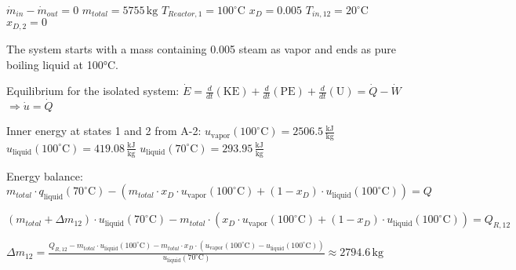 \( \dot{m}_{in} - \dot{m}_{out} = 0 \)  
\( m_{total} = 5755 \, \text{kg} \)  
\( T_{Reactor,1} = 100^\circ \text{C} \)  
\( x_D = 0.005 \)  
\( T_{in,12} = 20^\circ \text{C} \)  
\( x_{D,2} = 0 \)  

The system starts with a mass containing 0.005 steam as vapor and ends as pure boiling liquid at 100°C.  

Equilibrium for the isolated system:  
\( \dot{E} = \frac{d}{dt} (\text{KE}) + \frac{d}{dt} (\text{PE}) + \frac{d}{dt} (\text{U}) = \dot{Q} - \dot{W} \)  
\( \Rightarrow \dot{u} = \dot{Q} \)  

Inner energy at states 1 and 2 from A-2:  
\( u_{\text{vapor}}(100^\circ \text{C}) = 2506.5 \, \frac{\text{kJ}}{\text{kg}} \)  
\( u_{\text{liquid}}(100^\circ \text{C}) = 419.08 \, \frac{\text{kJ}}{\text{kg}} \)  
\( u_{\text{liquid}}(70^\circ \text{C}) = 293.95 \, \frac{\text{kJ}}{\text{kg}} \)  

Energy balance:  
\( m_{total} \cdot q_{\text{liquid}}(70^\circ \text{C}) - (m_{total} \cdot x_D \cdot u_{\text{vapor}}(100^\circ \text{C}) + (1 - x_D) \cdot u_{\text{liquid}}(100^\circ \text{C})) = Q \)  

\( (m_{total} + \Delta m_{12}) \cdot u_{\text{liquid}}(70^\circ \text{C}) - m_{total} \cdot (x_D \cdot u_{\text{vapor}}(100^\circ \text{C}) + (1 - x_D) \cdot u_{\text{liquid}}(100^\circ \text{C})) = Q_{R,12} \)  

\( \Delta m_{12} = \frac{Q_{R,12} - m_{total} \cdot u_{\text{liquid}}(100^\circ \text{C}) - m_{total} \cdot x_D \cdot (u_{\text{vapor}}(100^\circ \text{C}) - u_{\text{liquid}}(100^\circ \text{C}))}{u_{\text{liquid}}(70^\circ \text{C})} \approx 2794.6 \, \text{kg} \)